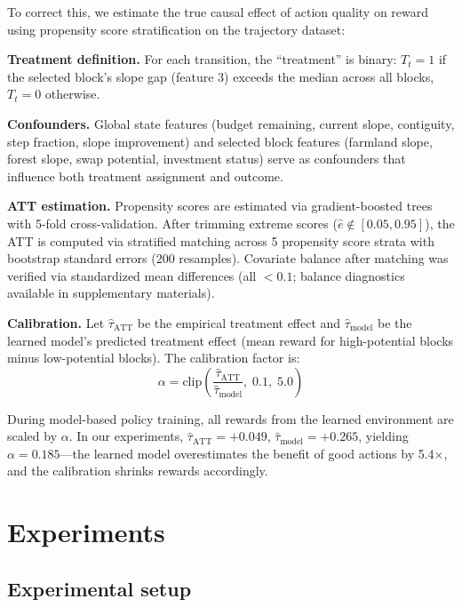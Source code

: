 \documentclass[11pt]{article}
\begin{document}
To correct this, we estimate the true causal effect of action quality on reward using propensity score stratification on the trajectory dataset:

\textbf{Treatment definition.} For each transition, the ``treatment'' is binary: $T_t = 1$ if the selected block's slope gap (feature 3) exceeds the median across all blocks, $T_t = 0$ otherwise.

\textbf{Confounders.} Global state features (budget remaining, current slope, contiguity, step fraction, slope improvement) and selected block features (farmland slope, forest slope, swap potential, investment status) serve as confounders that influence both treatment assignment and outcome.

\textbf{ATT estimation.} Propensity scores are estimated via gradient-boosted trees with 5-fold cross-validation. After trimming extreme scores ($\hat{e} \notin [0.05, 0.95]$), the ATT is computed via stratified matching across 5 propensity score strata with bootstrap standard errors (200 resamples). Covariate balance after matching was verified via standardized mean differences (all $< 0.1$; balance diagnostics available in supplementary materials).

\textbf{Calibration.} Let $\hat{\tau}_\text{ATT}$ be the empirical treatment effect and $\hat{\tau}_\text{model}$ be the learned model's predicted treatment effect (mean reward for high-potential blocks minus low-potential blocks). The calibration factor is:
\begin{equation}
\alpha = \text{clip}\left(\frac{\hat{\tau}_\text{ATT}}{\hat{\tau}_\text{model}},\; 0.1,\; 5.0\right)
\end{equation}

During model-based policy training, all rewards from the learned environment are scaled by $\alpha$. In our experiments, $\hat{\tau}_\text{ATT} = +0.049$, $\hat{\tau}_\text{model} = +0.265$, yielding $\alpha = 0.185$---the learned model overestimates the benefit of good actions by 5.4$\times$, and the calibration shrinks rewards accordingly.


\section{Experiments}
\label{sec:experiments}

\subsection{Experimental setup}
\end{document}
